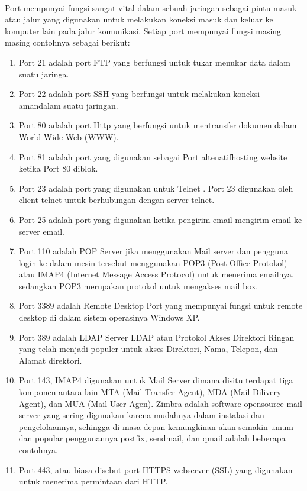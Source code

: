 \paragraph{}
\hspace{1cm}
Port mempunyai fungsi sangat vital dalam sebuah jaringan sebagai pintu masuk atau jalur yang digunakan untuk melakukan koneksi masuk dan keluar ke komputer lain pada jalur komunikasi. Setiap port mempunyai fungsi masing masing contohnya sebagai berikut:
\begin{enumerate}
\item Port 21 adalah port FTP yang berfungsi untuk tukar menukar data dalam suatu jaringa.
\item Port 22 adalah port SSH yang berfungsi untuk  melakukan koneksi amandalam suatu jaringan.
\item Port 80 adalah port Http yang berfungsi untuk mentransfer dokumen dalam World Wide Web (WWW).
\item Port 81 adalah port yang digunakan sebagai Port altenatifhosting website ketika Port 80 diblok.
\item Port 23 adalah port yang digunakan untuk Telnet . Port 23 digunakan oleh client telnet untuk berhubungan dengan server telnet.
\item Port 25 adalah port yang digunakan ketika pengirim email  mengirim email ke server email.
\item Port 110 adalah POP Server  jika menggunakan Mail server dan pengguna login ke dalam mesin tersebut menggunakan POP3 (Post Office Protokol) atau IMAP4 (Internet Message Access Protocol) untuk menerima emailnya, sedangkan POP3 merupakan protokol untuk mengakses mail box.
\item Port 3389 adalah Remote Desktop Port yang  mempunyai fungsi untuk remote desktop di dalam sistem operasinya Windows XP.
\item Port 389 adalah LDAP Server LDAP atau Protokol Akses Direktori Ringan yang telah
menjadi populer untuk akses Direktori, Nama, Telepon, dan Alamat direktori.
\item Port 143, IMAP4 digunakan untuk Mail Server dimana disitu terdapat tiga komponen antara lain MTA (Mail Transfer Agent), MDA (Mail Dilivery Agent), dan MUA (Mail User Agen). Zimbra adalah software opensource mail server yang sering digunakan karena mudahnya dalam instalasi dan pengelolaannya, sehingga di masa depan kemungkinan akan semakin umum dan popular penggunannya postfix, sendmail, dan qmail adalah beberapa contohnya.
\item Port 443, atau biasa disebut port HTTPS webserver (SSL) yang digunakan untuk menerima permintaan dari HTTP.

\end{enumerate}
